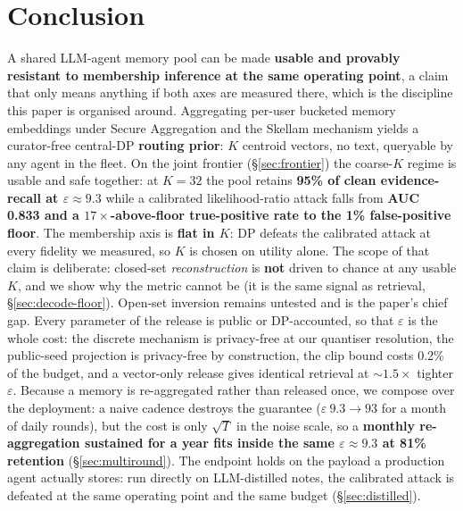 \documentclass[pdflatex,sn-mathphys-num,12pt]{sn-jnl}
\theoremstyle{thmstyleone}%
\theoremstyle{thmstyletwo}%
\theoremstyle{thmstylethree}%
\newcommand{\eps}{\varepsilon}
\newcommand{\secref}[1]{\S\ref{#1}}
\begin{document}
\section{Conclusion}\label{sec:conclusion}

A shared LLM-agent memory pool can be made \textbf{usable and provably resistant to membership
inference at the same operating point}, a claim that only means anything if both axes are measured
there, which is the discipline this paper is organised around. Aggregating per-user bucketed memory
embeddings under Secure Aggregation and the Skellam mechanism yields a curator-free central-DP
\textbf{routing prior}: $K$ centroid vectors, no text, queryable by any agent in the fleet. On the
joint frontier (\secref{sec:frontier}) the coarse-$K$ regime is usable and safe together: at
$K = 32$ the pool retains \textbf{95\% of clean evidence-recall at $\eps \approx 9.3$} while a
calibrated likelihood-ratio attack falls from \textbf{AUC 0.833 and a $17\times$-above-floor
true-positive rate to the 1\% false-positive floor}. The membership axis is \textbf{flat in $K$}: DP
defeats the calibrated attack at every fidelity we measured, so $K$ is chosen on utility alone. The
scope of that claim is deliberate: closed-set \emph{reconstruction} is \textbf{not} driven to chance
at any usable $K$, and we show why the metric cannot be (it is the same signal as retrieval,
\secref{sec:decode-floor}). Open-set inversion
remains untested and is the paper's chief gap. Every parameter of the release is public or
DP-accounted, so that $\eps$ is the whole cost: the discrete mechanism is privacy-free at our
quantiser resolution, the public-seed projection is privacy-free by construction, the clip bound costs
0.2\% of the budget, and a vector-only release gives identical retrieval at ${\sim}1.5\times$ tighter
$\eps$. Because a memory is re-aggregated rather than released once, we compose over the deployment: a
naive cadence destroys the guarantee ($\eps\ 9.3 \to 93$ for a month of daily rounds), but the cost is
only $\sqrt{T}$ in the noise scale, so a \textbf{monthly re-aggregation sustained for a year fits inside
the same $\eps \approx 9.3$ at 81\% retention} (\secref{sec:multiround}). The endpoint holds on the
payload a production agent actually stores: run directly on LLM-distilled notes, the calibrated attack
is defeated at the same operating point and the same budget (\secref{sec:distilled}).
\end{document}

